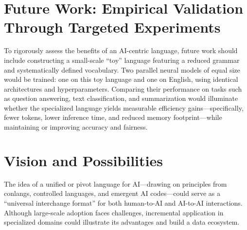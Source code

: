 \documentclass{article} %
\begin{document}
\section{Future Work: Empirical Validation Through Targeted Experiments}
To rigorously assess the benefits of an AI-centric language, future work should include constructing a small-scale ``toy'' language featuring a reduced grammar and systematically defined vocabulary. Two parallel neural models of equal size would be trained: one on this toy language and one on English, using identical architectures and hyperparameters. Comparing their performance on tasks such as question answering, text classification, and summarization would illuminate whether the specialized language yields measurable efficiency gains---specifically, fewer tokens, lower inference time, and reduced memory footprint---while maintaining or improving accuracy and fairness.

\section{Vision and Possibilities}
The idea of a unified or pivot language for AI---drawing on principles from conlangs, controlled languages, and emergent AI codes---could serve as a ``universal interchange format'' for both human-to-AI and AI-to-AI interactions. Although large-scale adoption faces challenges, incremental application in specialized domains could illustrate its advantages and build a data ecosystem.

%
%

\end{document}

